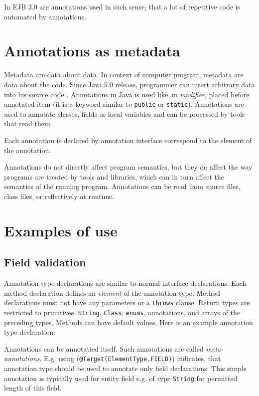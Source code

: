 \documentclass[11pt,twoside,a4paper]{book}
\begin{document}
In EJB 3.0 are annotations used in such sense, that a lot of repetitive code is
automated by annotations.

\section{Annotations as metadata}
Metadata are data about data. In context of computer program, metadata are data
about the code. Since Java 5.0 release, programmer can insert arbitrary data
into his source code \cite{java:annotations}. Annotations in Java is used like
an \textit{modifier}, placed before annotated item (it is a keyword similar to \verb|public| or
\verb|static|). Annotations are used to annotate classes, fields or local
variables and can be processed by tools that read them.

Each annotation is declared by annotation interface correspond to the element of
the annotation.

Annotations do not directly affect program semantics, but they do affect the way
programs are treated by tools and libraries, which can in turn affect the
semantics of the running program. Annotations can be read from source files,
class files, or reflectively at runtime.

\section{Examples of use}

\subsection{Field validation}

Annotation type declarations are similar to normal interface declarations. Each method
declaration defines an \textit{element} of the annotation type. Method
declarations must not have any parameters or a \verb|throws| clause. Return
types are restricted to primitives, \verb|String|, \verb|Class|, \verb|enums|,
annotations, and arrays of the preceding types. Methods can have default values.
Here is an example annotation type declaration:



Annotations can be annotatied itself. Such annotations are called
\textit{meta-annotations}. E.g. using
(\verb|@Target(ElementType.FIELD)|) indicates, that annotation type should
be used to annotate only field declarations.
This simple annotation is typically used for entity field e.g. of type
\verb|String| for permitted length of this field.
\end{document}
